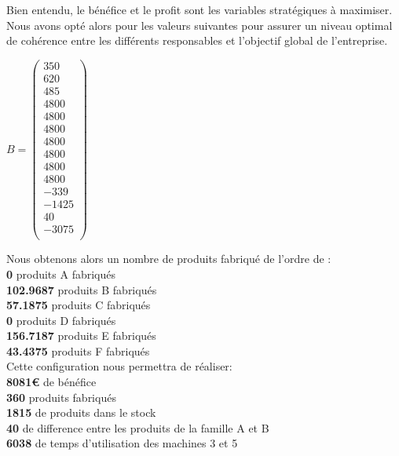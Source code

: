 \documentclass[a4paper, 11pt]{article}
\begin{document}
Bien entendu, le bénéfice et le profit sont les variables stratégiques à maximiser.  
Nous avons opté alors pour les valeurs suivantes pour assurer un niveau optimal de cohérence entre les différents responsables et l'objectif global de l'entreprise. 

$ B = \begin{pmatrix}
350\\
620\\
485\\
4800\\
4800\\
4800\\
4800\\
4800\\
4800\\
4800\\
-339\\
-1425\\
40\\
-3075 \\
 \end{pmatrix} $
 
Nous obtenons alors un nombre de produits fabriqué de l'ordre de : \\
\textbf{0} produits A fabriqués \\
\textbf{102.9687} produits B fabriqués \\
\textbf{57.1875} produits C fabriqués \\
\textbf{0} produits D fabriqués \\
\textbf{156.7187} produits E fabriqués \\
\textbf{43.4375} produits F fabriqués \\

Cette configuration nous permettra de réaliser:\\
\textbf{8081€} de bénéfice\\
\textbf{360} produits fabriqués\\
\textbf{1815} de produits dans le stock\\
\textbf{40} de difference entre les produits de la famille A et B\\ 
\textbf{6038} de temps d'utilisation des machines 3 et 5\\
\end{document}
